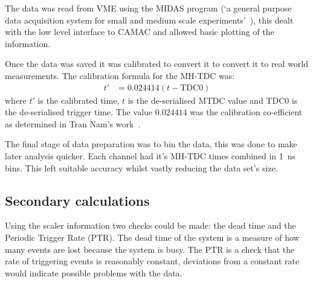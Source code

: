 The data was read from VME using the MIDAS program (`a general purpose data acquisition system for small and medium scale experiments'~\cite{ritt2012midas}), this dealt with the low level interface to CAMAC and allowed basic plotting of the information.

Once the data was saved it was calibrated to convert it to convert it to real world measurements. The calibration formula for the MH-TDC was:
\begin{align}\label{equ:tdc_calibration}
    t'   &= 0.024414(t - \text{TDC0})
\end{align}
where \(t'\) is the calibrated time, \(t\) is the de-serialised MTDC value and TDC0 is the de-serialised trigger time. The value \(0.024414\) was the calibration co-efficient as determined in Tran Nam's work~\cite{timecalibNam2012}.

The final stage of data preparation was to bin the data, this was done to make later analysis quicker. Each channel had it's MH-TDC times combined in 1~ns bins. This left suitable accuracy whilst vastly reducing the data set's size.

\subsection{Secondary calculations} %
\label{sec:secondary_calculations}
Using the scaler information two checks could be made: the dead time and the Periodic Trigger Rate (PTR). The dead time of the system is a measure of how many events are lost because the system is busy. The PTR is a check that the rate of triggering events is reasonably constant, deviations from a constant rate would indicate possible problems with the data.

